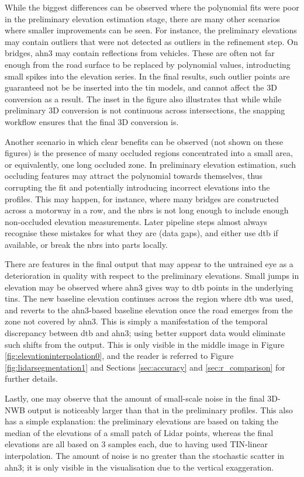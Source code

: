 While the biggest differences can be observed where the polynomial fits were poor in the preliminary elevation estimation stage, there are many other scenarios where smaller improvements can be seen. For instance, the preliminary elevations may contain outliers that were not detected as outliers in the refinement step. On bridges, \ac{ahn3} may contain reflections from vehicles. These are often not far enough from the road surface to be replaced by polynomial values, introducting small spikes into the elevation series. In the final results, such outlier points are guaranteed not be be inserted into the \ac{tin} models, and cannot affect the 3D conversion as a result. The inset in the figure also illustrates that while while preliminary 3D conversion is not continuous across intersections, the snapping workflow ensures that the final 3D conversion is.

Another scenario in which clear benefits can be observed (not shown on these figures) is the presence of many occluded regions concentrated into a small area, or equivalently, one long occluded zone. In preliminary elevation estimation, such occluding features may attract the polynomial towards themselves, thus corrupting the fit and potentially introducing incorrect elevations into the profiles. This may happen, for instance, where many bridges are constructed across a motorway in a row, and the \ac{nbrs} is not long enough to include enough non-occluded elevation measurements. Later pipeline steps almost always recognise these mistakes for what they are (data gaps), and either use \ac{dtb} if available, or break the \ac{nbrs} into parts locally.

There are features in the final output that may appear to the untrained eye as a deterioration in quality with respect to the preliminary elevations. Small jumps in elevation may be observed where \ac{ahn3} gives way to \ac{dtb} points in the underlying \ac{tin}s. The new baseline elevation continues across the region where \ac{dtb} was used, and reverts to the \ac{ahn3}-based baseline elevation once the road emerges from the zone not covered by \ac{ahn3}. This is simply a manifestation of the temporal discrepancy between \ac{dtb} and \ac{ahn3}; using better support data would eliminate such shifts from the output. This is only visible in the middle image in Figure \ref{fig:elevationinterpolation0}, and the reader is referred to Figure \ref{fig:lidarsegmentation1} and Sections \ref{sec:accuracy} and \ref{sec:r_comparison} for further details.

Lastly, one may observe that the amount of small-scale noise in the final 3D-NWB output is noticeably larger than that in the preliminary profiles. This also has a simple explanation: the preliminary elevations are based on taking the median of the elevations of a small patch of Lidar points, whereas the final elevations are all based on 3 samples each, due to having used TIN-linear interpolation. The amount of noise is no greater than the stochastic scatter in \ac{ahn3}; it is only visible in the visualisation due to the vertical exaggeration.

